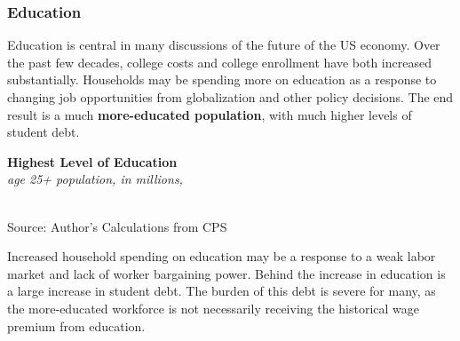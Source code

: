 \documentclass{report}
\newcommand{\tbllink}[1]{\href{https://raw.githubusercontent.com/bdecon/US-chartbook/master/chartbook/data/#1}{\faTable}}
\newcommand{\barylab}[2]{yticklabel style={text width=#1, align=right, 
		style={black!70}, text height=#2},}
\newcommand{\bbar}[2]{extra #1 ticks = {{#2}}, extra #1 tick labels = ,
		extra #1 tick style = {grid=major, grid style={thick, black!25}},}
\newcommand{\barplotnogrid}{xbar=0pt, axis line style={draw=none},
	    yticklabel style={align=left, anchor=east},
      		xmajorticks=false, ymajorgrids=false,   
	    ytick=data, tickwidth=0pt, area legend, reverse legend,
	    nodes near coords align={horizontal},}
\begin{document}
{\begin{minipage}{0.76\textwidth}
\subsubsection*{Education}
\small Education is central in many discussions of the future of the US economy. Over the past few decades, college costs and college enrollment have both increased substantially. Households may be spending more on education as a response to changing job opportunities from globalization and other policy decisions. The end result is a much \textbf{more-educated population}, with much higher levels of student debt.
\end{minipage}
\vspace{1mm}

\begin{minipage}{0.33\textwidth}
\small  
\end{minipage}\hspace{6mm}
\begin{minipage}{0.38\textwidth}
\normalsize \textbf{Highest Level of Education}\\
\footnotesize{\textit{age 25+ population, in millions, }}\\
\hspace*{-4mm} \\
\footnotesize{Source: Author's Calculations from CPS} \hfill \tbllink{cps_educ_tot.csv}
\end{minipage}
\vspace{1mm}

\begin{minipage}{0.76\textwidth}
\small 

Increased household spending on education may be a response to a weak labor market and lack of worker bargaining power. Behind the increase in education is a large increase in student debt. The burden of this debt is severe for many, as the more-educated workforce is not necessarily receiving the historical wage premium from education. 
\vspace{2mm}


\end{minipage}}
\end{document}
